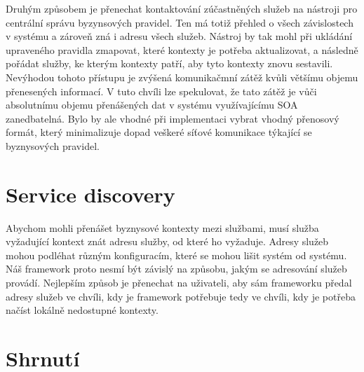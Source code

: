 Druhým způsobem je přenechat kontaktování zúčastněných služeb na nástroji pro centrální
správu byzynsových pravidel. Ten má totiž přehled o všech závislostech v systému a zároveň
zná i adresu všech služeb. Nástroj by tak mohl při ukládání upraveného pravidla zmapovat,
které kontexty je potřeba aktualizovat, a následně pořádat služby, ke kterým kontexty patří,
aby tyto kontexty znovu sestavili. Nevýhodou tohoto přístupu je zvýšená komunikačmní zátěž kvůli většímu
objemu přenesených informací. V tuto chvíli lze spekulovat, že tato zátěž je vůči absolutnímu objemu
přenášených dat v systému využívajícímu \gls{SOA} zanedbatelná. Bylo by ale vhodné při implementaci
vybrat vhodný přenosový formát, který minimalizuje dopad veškeré síťové komunikace týkající se
byznysových pravidel.

\section{Service discovery}

Abychom mohli přenášet byznysové kontexty mezi službami, musí služba vyžadující kontext
znát adresu služby, od které ho vyžaduje. Adresy služeb mohou podléhat různým konfiguracím,
které se mohou lišit systém od systému. Náš framework proto nesmí být závislý na způsobu,
jakým se adresování služeb provádí. Nejlepším způsob je přenechat na uživateli, aby sám
frameworku předal adresy služeb ve chvíli, kdy je framework potřebuje \textendash\xspace tedy
ve chvíli, kdy je potřeba načíst lokálně nedostupné kontexty.

\section{Shrnutí}


